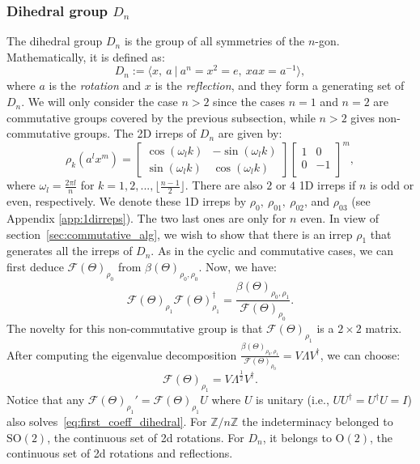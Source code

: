 \documentclass{article}
\theoremstyle{plain}
\theoremstyle{definition}
\theoremstyle{remark}
\begin{document}
\subsubsection{Dihedral group $D_n$}\label{sec:inversion_dihedral}
The dihedral group $D_n$ is the group of all symmetries of the $n$-gon. Mathematically, it is defined as:
\begin{equation}\label{def:dihedral}
    D_n:=\langle x,\ a\ |\ a^n=x^2=e,\ xax = a^{-1}\rangle,
\end{equation}
where $a$ is the \emph{rotation} and $x$ is the \emph{reflection}, and they form a generating set of $D_n$. We will only consider the case $n>2$ since the cases $n=1$ and $n=2$ are commutative groups covered by the previous subsection, while $n>2$ gives non-commutative groups. The 2D irreps of $D_n$ are given by:
\begin{equation}\label{eq:2d_irreps_dn}
    \rho_k(a^lx^m)=\begin{bmatrix}
        \cos(\omega_l k)&-\sin(\omega_l k)\\
        \sin(\omega_l k)&\cos(\omega_l k)
    \end{bmatrix}
    \begin{bmatrix}
        1 & 0\\
        0 & -1\\
    \end{bmatrix}^m,
\end{equation}
where $\omega_l = \frac{2\pi l}{n}$ for $k=1,2,...,\lfloor \frac{n-1}{2}\rfloor$. There are also $2$ or $4$ 1D irreps if $n$ is odd or even, respectively. We denote these 1D irreps by $\rho_{0},\ \rho_{01},\ \rho_{02}$, and $\rho_{03}$ (see Appendix \ref{app:1dirreps}). The two last ones are only for $n$ even.
In view of section~\ref{sec:commutative_alg}, we wish to show that there is an irrep $\rho_1$ that generates all the irreps of $D_n$. As in the cyclic and commutative cases, we can first deduce $\mathcal{F}(\Theta)_{\rho_0}$ from $\beta(\Theta)_{\rho_0,\rho_0}$. Now, we have:
\begin{equation}\label{eq:first_coeff_dihedral}
    \mathcal{F}(\Theta)_{\rho_1}\mathcal{F}(\Theta)_{\rho_1}^\dagger=\frac{\beta(\Theta)_{\rho_0,\rho_1}}{\mathcal{F}(\Theta)_{\rho_0}}.
\end{equation}
The novelty for this non-commutative group is that $\mathcal{F}(\Theta)_{\rho_1}$ is a $2\times 2$ matrix. After computing the eigenvalue decomposition $\frac{\beta(\Theta)_{\rho_0,\rho_1}}{\mathcal{F}(\Theta)_{\rho_0}} = V\Lambda V^\dagger$, we can choose:
\begin{equation}
    \mathcal{F}(\Theta)_{\rho_1} = V\Lambda^{\frac{1}{2}}V^\dagger.
\end{equation}
Notice that any $\mathcal{F}(\Theta)_{\rho_1}' = \mathcal{F}(\Theta)_{\rho_1} U$ where $U$ is unitary (i.e., $UU^\dagger=U^\dagger U=I$) also solves~\eqref{eq:first_coeff_dihedral}. For $\mathbb{Z}/n\mathbb{Z}$ the indeterminacy belonged to $\mathrm{SO}(2)$, the continuous set of 2d rotations. For $D_n$, it belongs to $\mathrm{O}(2)$, the continuous set of 2d rotations and reflections.
\end{document}
